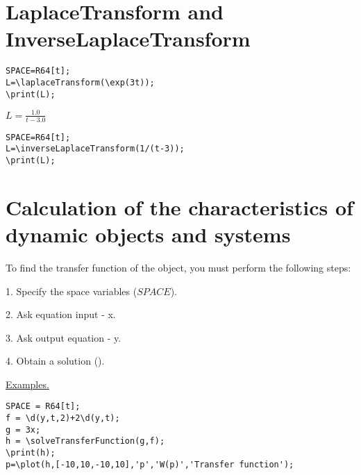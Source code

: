 \section{LaplaceTransform and InverseLaplaceTransform}

\begin{verbatim}
SPACE=R64[t];
L=\laplaceTransform(\exp(3t));
\print(L);
\end{verbatim}

{$L = \frac {1.0}{t - 3.0}$}

\begin{verbatim}
SPACE=R64[t];
L=\inverseLaplaceTransform(1/(t-3));
\print(L);
\end{verbatim}

\section{Calculation of the characteristics of dynamic objects and systems}
To find the transfer function of the object, you must perform the following steps:

1. Specify the space variables ($SPACE$). 

2. Ask equation input - x. 

3. Ask output equation - y. 

4. Obtain a solution (). 


\underline{Examples. }

\vspace*{-2mm}

\begin{verbatim}
SPACE = R64[t]; 
f = \d(y,t,2)+2\d(y,t); 
g = 3x; 
h = \solveTransferFunction(g,f); 
\print(h);
p=\plot(h,[-10,10,-10,10],'p','W(p)','Transfer function'); 
\end{verbatim}



